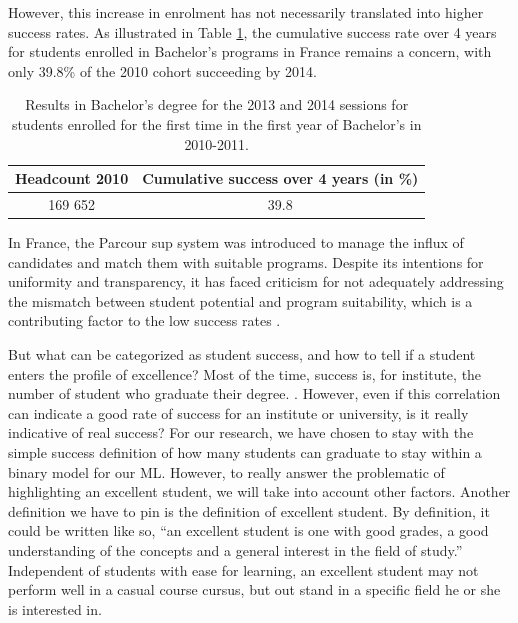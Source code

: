 \documentclass[conference]{IEEEtran}
\begin{document}
However, this increase in enrolment has not necessarily translated into higher success rates. As illustrated in Table \ref{tab:result_bachelor}, the cumulative success rate over 4 years for students enrolled in Bachelor's programs in France remains a concern, with only 39.8\% of the 2010 cohort succeeding by 2014.

\begin{table}[H]
    \centering
    \caption{Results in Bachelor's degree for the 2013 and 2014 sessions for students enrolled for the first time in the first year of Bachelor's in 2010-2011.\cite{kabla-langlois_insee_2016}}
    \begin{tabular}{|c|c|}
        \hline
        \textbf{Headcount 2010} & \textbf{Cumulative success over 4 years (in \%)}\\
        \hline
        169 652 & 39.8 \\
        \hline
    \end{tabular}
    \label{tab:result_bachelor}
\end{table}

In France, the Parcour sup system was introduced to manage the influx of candidates and match them with suitable programs. Despite its intentions for uniformity and transparency, it has faced criticism for not adequately addressing the mismatch between student potential and program suitability, which is a contributing factor to the low success rates \cite{couto_parcoursup_2021}.

But what can be categorized as student success, and how to tell if a student enters the profile of excellence? Most of the time, success is, for institute, the number of student who graduate their degree. \cite{weatherton_success_2021}. However, even if this correlation can indicate a good rate of success for an institute or university, is it really indicative of real success? For our research, we have chosen to stay with the simple success definition of how many students can graduate to stay within a binary model for our ML. However, to really answer the problematic of highlighting an excellent student, we will take into account other factors.
Another definition we have to pin is the definition of excellent student. By definition, it could be written like so, “an excellent student is one with good grades, a good understanding of the concepts and a general interest in the field of study.” Independent of students with ease for learning, an excellent student may not perform well in a casual course cursus, but out stand in a specific field he or she is interested in. 
\end{document}
